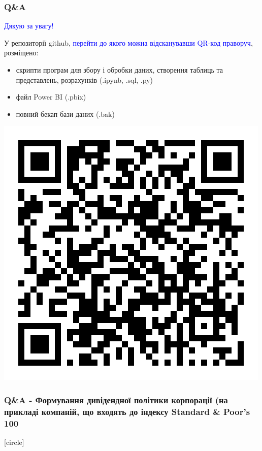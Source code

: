 \documentclass[aspectratio=169]{beamer}
\begin{document}
\begin{frame}
\frametitle{Q\&A}
\begin{center}
\bigskip
\textcolor{blue}{\huge Дякую за увагу!} \\
\end{center}
\begin{multicols}{2}

\vbox{\vspace{0.1cm}}
У репозиторії github, \textcolor{blue}{перейти до якого можна відсканувавши QR-код праворуч}, розміщено:
\begin{itemize}
\item скрипти програм для збору і обробки даних, створення таблиць та представлень, розрахунків (.ipynb, .sql, .py)
\item файл Power BI (.pbix)
\item повний бекап бази даних (.bak) 
\end{itemize}
\columnbreak
\hspace{5mm}
\includegraphics[scale=0.35]{QR code.png}
\end{multicols}
\end{frame}

\begin{frame}
\frametitle {Q\&A - Формування дивідендної політики корпорації (на прикладі компаній, що входять до індексу Standard \& Poor's 100 }
[circle]
\tableofcontents
\end{frame}
\end{document}
